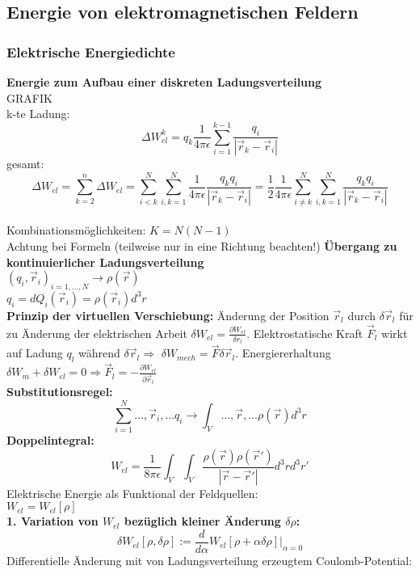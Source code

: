 \documentclass[english]{latex4ei/latex4ei_sheet}
\begin{document}
\subsection{Energie von elektromagnetischen Feldern}
\subsubsection{Elektrische Energiedichte}
\textbf{Energie zum Aufbau einer diskreten Ladungsverteilung}\\
GRAFIK\\
k-te Ladung: \[\Delta W_{el}^{k}=q_k \frac{1}{4 \pi \epsilon}\sum_{i=1}^{k-1} \frac{q_i}{|\vec{r}_k-\vec{r}_i|}\]
gesamt: \[\Delta W_{el}=\sum_{k=2}^n \Delta W_{el}=\sum_{i<k}^{N} \sum_{i,k=1}^{N} \frac{1}{4 \pi \epsilon} \frac{q_k q_i}{|\vec{r}_k-\vec{r}_i|}=\frac{1}{2} \frac{1}{4 \pi \epsilon}\sum_{i \neq k}^{N} \sum_{i,k=1}^{N} \frac{q_k q_i}{|\vec{r}_k-\vec{r}_i|}\]\\
Kombinationsm\"oglichkeiten: $K=N(N-1)$\\
Achtung bei Formeln (teilweise nur in eine Richtung beachten!)
\textbf{\"Ubergang zu kontinuierlicher Ladungsverteilung}\\
${(q_i,\vec{r}_i)}_{i=1,\ldots,N} \to \rho(\vec{r})$\\
$q_i=d Q_i(\vec{r}_i)=\rho(\vec{r}_i) d^3 r$\\
\textbf{Prinzip  der virtuellen Verschiebung:} \"Anderung der Position $\vec{r}_l$ durch $\delta \vec{r}_l$ f\"ur zu \"Anderung der elektrischen Arbeit $\delta W_{el}=\frac{\partial W_{el}}{\delta r_l}$. Elektrostatische Kraft $\vec{F}_l$ wirkt auf Ladung $q_l$ w\"ahrend $\delta \vec{r}_l \Rightarrow$ $\delta W_{mech}=\vec{F} \delta \vec{r}_l$. Energiererhaltung $\delta W_m + \delta W_{el}=0 \Rightarrow \vec{F}_l=-\frac{\partial W_{el}}{\partial \vec{r}_l}$\\
\textbf{Substitutionsregel:}
\[\sum_{i=1}^N {\ldots,\vec{r}_i,\ldots} q_i \to \int_V {\ldots,\vec{r},\ldots} \rho(\vec{r}) d^3 r\]
\textbf{Doppelintegral:}
\[W_{el}=\frac{1}{8 \pi \epsilon} \int_V \int_V \frac{\rho(\vec{r}) \rho(\vec{r}')}{|\vec{r}-\vec{r}'|}d^3 r d^3 r'\]
Elektrische Energie als Funktional der Feldquellen:\\
$W_{el}=W_{el}[\rho]$\\
\textbf{1. Variation von $W_{el}$ bez\"uglich kleiner \"Anderung $\delta \rho$:}\\
\[\delta W_{el}[\rho,\delta \rho] := \frac{d}{d \alpha}W_{el}[\rho+\alpha \delta \rho]|_{\alpha=0}\]
Differentielle \"Anderung mit von Ladungsverteilung erzeugtem Coulomb-Potential:\\
\end{document}
